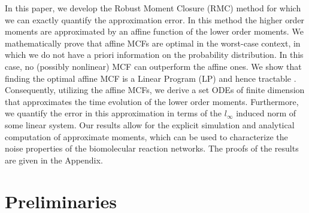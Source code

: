\documentclass[letterpaper, 10 pt, conference]{ieeeconf}
\begin{document}
In this paper, we develop the Robust Moment Closure (RMC) method for which
we can exactly quantify the approximation error. In this method the higher
order moments are approximated by an affine function of the lower order
moments. We mathematically prove that affine MCFs are optimal in the
worst-case context, in which we do not have a priori information on the
probability distribution. In this case, no (possibly nonlinear) MCF can
outperform the affine ones. We show that finding the optimal affine MCF is a
Linear Program (LP) and hence tractable \cite{luenberger1973introduction}.
Consequently, utilizing the affine MCFs, we derive a set ODEs of finite
dimension that approximates the time evolution of the lower order moments.
Furthermore, we quantify the error in this approximation in terms of the $%
l_{\infty }$ induced norm of some linear system. Our results allow for the
explicit simulation and analytical computation of approximate moments, which
can be used to characterize the noise properties of the biomolecular
reaction networks. The proofs of the
results are given in the Appendix.

\section{Preliminaries}
\end{document}
